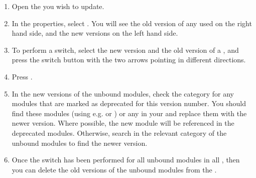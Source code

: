 \begin{enumerate}
\item Open the \gdproject{} you wish to update.
\item In the \gdproject{} properties, select . You will see the old version of any used \gdprojects{} on the right hand side, and the new versions on the left hand side.
\item To perform a switch, select the new version and the old version of a \gdproject{}, and press the switch button with the two arrows pointing in different directions.
\item Press . 
\item In the new versions of the unbound modules, check the category  for any modules that are marked as deprecated for this version number. You should find these modules (using e.g.  or ) or any \gdsteps{} in your \gdproject{} and replace them with the newer version. Where possible, the new module will be referenced in the deprecated modules. Otherwise, search in the relevant category of the unbound modules to find the newer version. 
\item Once the switch has been performed for all unbound modules in all \gdprojects{}, then you can delete the old versions of the unbound modules from the \gddb{}. 
\end{enumerate}
